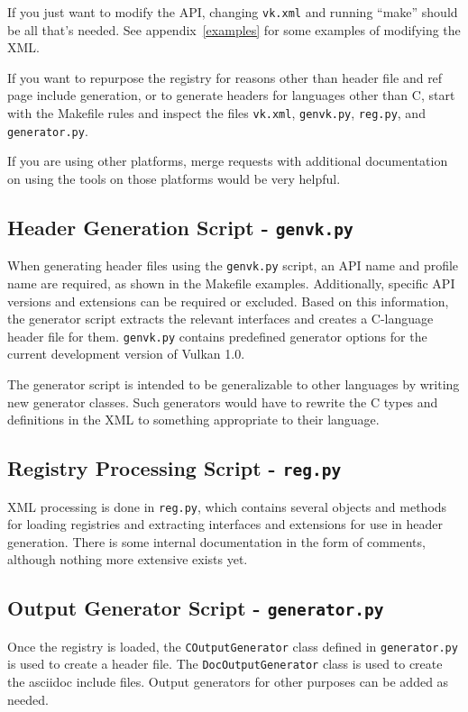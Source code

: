\documentclass{article}
\def\code#1{{\tt #1}}
\begin{document}
If you just want to modify the API, changing \code{vk.xml} and running
``make'' should be all that's needed. See appendix~\ref{examples} for some
examples of modifying the XML.

If you want to repurpose the registry for reasons other than header file
and ref page include generation, or to generate headers for languages
other than C, start with the Makefile rules and inspect the files
\code{vk.xml}, \code{genvk.py}, \code{reg.py}, and \code{generator.py}.

If you are using other platforms, merge requests with additional
documentation on using the tools on those platforms would be very helpful.

\subsection{Header Generation Script - \code{genvk.py}}

When generating header files using the \code{genvk.py} script, an API name
and profile name are required, as shown in the Makefile examples.
Additionally, specific API versions and extensions can be required or
excluded. Based on this information, the generator script extracts the
relevant interfaces and creates a C-language header file for them.
\code{genvk.py} contains predefined generator options for the current
development version of Vulkan 1.0.

The generator script is intended to be generalizable to other languages by
writing new generator classes. Such generators would have to rewrite the C
types and definitions in the XML to something appropriate to their language.

\subsection{Registry Processing Script - \code{reg.py}}

XML processing is done in \code{reg.py}, which contains several objects and
methods for loading registries and extracting interfaces and extensions for
use in header generation. There is some internal documentation in the form
of comments, although nothing more extensive exists yet.

\subsection{Output Generator Script - \code{generator.py}}

Once the registry is loaded, the \code{COutputGenerator} class defined in
\code{generator.py} is used to create a header file. The
\code{DocOutputGenerator} class is used to create the asciidoc include
files. Output generators for other purposes can be added as needed.
\end{document}
